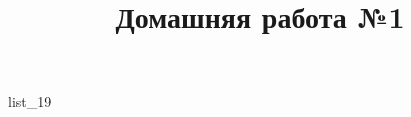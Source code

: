 \documentclass[12pt, a4paper]{article}
\begin{document}
	\title{Домашняя работа №1}
	{list_19}
\end{document}

